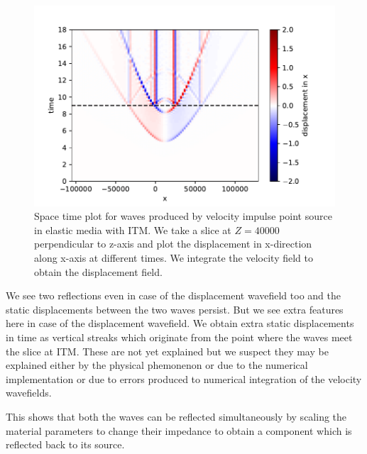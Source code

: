 \begin{figure}[!htpb]
    \centering
    \includegraphics[width=0.75\linewidth]{figures/Elastic-tworeflections-displacement.pdf}
    \caption{Space time plot for waves produced by velocity impulse point source in elastic media with \ac{ITM}. We take a slice at $Z=40000$ perpendicular to z-axis
    and plot the displacement in x-direction along x-axis at different times. We integrate the velocity field to obtain the displacement field.}
    \label{fig:space-timeplot-elasticITMdisplacement}
\end{figure}

We see two reflections even in case of the displacement wavefield too and the static displacements between the two waves persist. But we see extra features here in case of the displacement wavefield. We obtain extra static displacements in time as vertical streaks which originate from the point where the waves meet the slice at \ac{ITM}. These are not yet explained but we suspect they may be explained either by the physical phemonenon or due to the numerical implementation or due to errors produced to numerical integration of the velocity wavefields.
\par This shows that both the waves can be reflected simultaneously by scaling the material parameters to change their impedance to obtain a component which 
is reflected back to its source.

